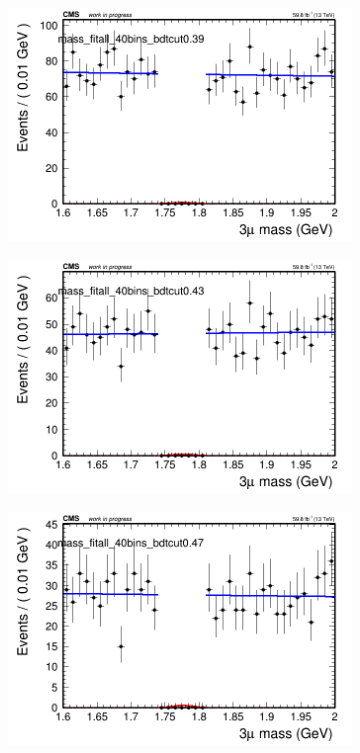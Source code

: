 \begin{figure}[H]
\begin{subfigure}{0.2\textwidth}
        \caption{}
    \end{subfigure}
    \begin{subfigure}{0.2\textwidth}
        \includegraphics[width=\textwidth]{power_law/plots/all/massfit_all_40bins_bdtcut0.39.png}
        \caption{}
    \end{subfigure}
    \begin{subfigure}{0.2\textwidth}
        \includegraphics[width=\textwidth]{power_law/plots/all/massfit_all_40bins_bdtcut0.43.png}
        \caption{}
    \end{subfigure}
    \begin{subfigure}{0.2\textwidth}
        \includegraphics[width=\textwidth]{power_law/plots/all/massfit_all_40bins_bdtcut0.47.png}

\end{subfigure}
\end{figure}
